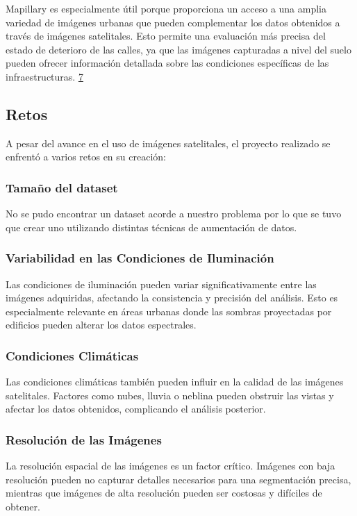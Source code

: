 \documentclass{article}
\begin{document}
\begin{enumerate}
    Mapillary es especialmente útil porque proporciona un acceso a una amplia variedad de imágenes urbanas que pueden complementar los datos obtenidos a través de imágenes satelitales. Esto permite una evaluación más precisa del estado de deterioro de las calles, ya que las imágenes capturadas a nivel del suelo pueden ofrecer información detallada sobre las condiciones específicas de las infraestructuras. \href{https://www.mapillary.com/}{7}
\end{enumerate}

\subsection{Retos}
A pesar del avance en el uso de imágenes satelitales, el proyecto realizado se enfrent\'o a varios retos en su creación:

\subsubsection{Tama\~no del dataset}
No se pudo encontrar un dataset acorde a nuestro problema por lo que se tuvo que crear uno utilizando distintas t\'ecnicas de aumentaci\'on de datos.

\subsubsection{Variabilidad en las Condiciones de Iluminación}
Las condiciones de iluminación pueden variar significativamente entre las imágenes adquiridas, afectando la consistencia y precisión del análisis. Esto es especialmente relevante en áreas urbanas donde las sombras proyectadas por edificios pueden alterar los datos espectrales.

\subsubsection{Condiciones Climáticas}
Las condiciones climáticas también pueden influir en la calidad de las imágenes satelitales. Factores como nubes, lluvia o neblina pueden obstruir las vistas y afectar los datos obtenidos, complicando el análisis posterior.

\subsubsection{Resolución de las Imágenes}
La resolución espacial de las imágenes es un factor crítico. Imágenes con baja resolución pueden no capturar detalles necesarios para una segmentación precisa, mientras que imágenes de alta resolución pueden ser costosas y difíciles de obtener.
\end{document}
